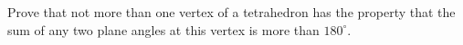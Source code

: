 Prove that not more than one vertex of a tetrahedron has the property that the sum of any two plane angles at this vertex is more than $180^\circ$.
